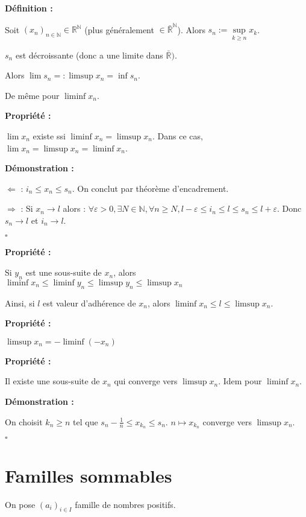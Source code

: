 \documentclass[10pt,a4paper,notitlepage ]{report}
\newcommand{\1}{\mathds 1}
\newenvironment{definition}[1][]{
	
	\textbf{Définition #1 : }
}
{}
\newcounter{th}
\newenvironment{propriete}[1][]{
	\begin{tcolorbox}
		\textbf{Propriété #1 : }
}
{\end{tcolorbox}}
\newenvironment{demo}[1][]{

	\textbf{Démonstration #1 :}
}{\begin{flushright}
	$\square$
\end{flushright}
}
\begin{document}
\begin{definition}
	
Soit $(x_n)_{n\in\mathbb N} \in \mathbb R ^\mathbb N$ (plus généralement $\in\bar{\mathbb R}^\mathbb N$). Alors $s_n := \underset{k\geq n}{\sup} x_k$.

$s_n$ est décroissante (donc a une limite dans $\bar{\mathbb R})$.

Alors $\lim s_n =: \limsup x_n = \inf s_n$.

De même pour $\liminf x_n$. 
\end{definition}
\begin{propriete}
	$\lim x_n$ existe ssi $\liminf x_n = \limsup x_n$. Dans ce cas, $\lim x_n = \limsup x_n = \liminf x_n$.
\end{propriete}

\begin{demo}
	$\Leftarrow$ : $i_n \leq x_n \leq s_n$. On conclut par théorème d'encadrement.
	
	$\Rightarrow$ : Si $x_n \rightarrow l$ alors : $\forall \varepsilon > 0, \exists N \in \mathbb N, \forall n \geq N, l-\varepsilon \leq i_n \leq l \leq s_n \leq l+\varepsilon$.
	Donc $s_n \rightarrow l$ et $i_n \rightarrow l$.
\end{demo}

\begin{propriete}
	Si $y_n$ est une sous-suite de $x_n$, alors $\liminf x_n \le \liminf y_n \le \limsup y_n \le \limsup x_n$
\end{propriete}

Ainsi, si $l$ est valeur d'adhérence de $x_n$, alors $\liminf x_n \le l \le \limsup x_n$.
\begin{propriete}
	$\limsup x_n = -\liminf (-x_n)$
\end{propriete}

\begin{propriete}
	Il existe une sous-suite de $x_n$ qui converge vers $\limsup x_n$. Idem pour $\liminf x_n$.
\end{propriete}
\begin{demo}
	On choisit $k_n \ge n$ tel que $s_n - \frac{1}{n} \le x_{k_n} \le s_n$. $n \mapsto x_{k_n}$ converge vers $\limsup x_n$.
\end{demo}

\section{Familles sommables}

On pose $(a_i)_{i\in I}$ famille de nombres positifs.
\end{document}
